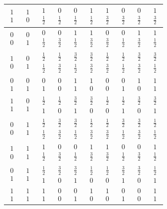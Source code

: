 \documentclass[11pt]{article}
\providecommand{\chpair}[2]{\begin{smallmatrix}#1\\#2\end{smallmatrix}}
\begin{document}
{\begin{tabular}{|cc||cc|cc|cc|cc|}
$\chpair{1}{1}$ & $\chpair{1}{0}$ & $\chpair{1}{\tfrac{1}{2}}$ & $\chpair{0}{\tfrac{1}{2}}$ & $\chpair{0}{\tfrac{1}{2}}$ & $\chpair{1}{\tfrac{1}{2}}$ & $\chpair{1}{\tfrac{3}{2}}$ & $\chpair{0}{\tfrac{3}{2}}$ & $\chpair{0}{\tfrac{3}{2}}$ & $\chpair{1}{\tfrac{3}{2}}$\\
\hline
$\chpair{0}{0}$ & $\chpair{0}{1}$ & $\chpair{0}{\tfrac{1}{2}}$ & $\chpair{0}{\tfrac{3}{2}}$ & $\chpair{1}{\tfrac{1}{2}}$ & $\chpair{1}{\tfrac{3}{2}}$ & $\chpair{0}{\tfrac{3}{2}}$ & $\chpair{0}{\tfrac{1}{2}}$ & $\chpair{1}{\tfrac{3}{2}}$ & $\chpair{1}{\tfrac{1}{2}}$\\
$\chpair{1}{0}$ & $\chpair{0}{1}$ & $\chpair{\tfrac{1}{2}}{\tfrac{1}{2}}$ & $\chpair{\tfrac{1}{2}}{\tfrac{3}{2}}$ & $\chpair{\tfrac{3}{2}}{\tfrac{1}{2}}$ & $\chpair{\tfrac{3}{2}}{\tfrac{3}{2}}$ & $\chpair{\tfrac{1}{2}}{\tfrac{3}{2}}$ & $\chpair{\tfrac{1}{2}}{\tfrac{1}{2}}$ & $\chpair{\tfrac{3}{2}}{\tfrac{3}{2}}$ & $\chpair{\tfrac{3}{2}}{\tfrac{1}{2}}$\\
$\chpair{0}{1}$ & $\chpair{0}{1}$ & $\chpair{0}{1}$ & $\chpair{0}{0}$ & $\chpair{1}{1}$ & $\chpair{1}{0}$ & $\chpair{0}{0}$ & $\chpair{0}{1}$ & $\chpair{1}{0}$ & $\chpair{1}{1}$\\
$\chpair{1}{1}$ & $\chpair{0}{1}$ & $\chpair{\tfrac{1}{2}}{1}$ & $\chpair{\tfrac{1}{2}}{0}$ & $\chpair{\tfrac{3}{2}}{1}$ & $\chpair{\tfrac{3}{2}}{0}$ & $\chpair{\tfrac{1}{2}}{0}$ & $\chpair{\tfrac{1}{2}}{1}$ & $\chpair{\tfrac{3}{2}}{0}$ & $\chpair{\tfrac{3}{2}}{1}$\\
\hline
$\chpair{0}{0}$ & $\chpair{1}{1}$ & $\chpair{\tfrac{1}{2}}{\tfrac{1}{2}}$ & $\chpair{\tfrac{3}{2}}{\tfrac{3}{2}}$ & $\chpair{\tfrac{3}{2}}{\tfrac{1}{2}}$ & $\chpair{\tfrac{1}{2}}{\tfrac{3}{2}}$ & $\chpair{\tfrac{1}{2}}{\tfrac{3}{2}}$ & $\chpair{\tfrac{3}{2}}{\tfrac{1}{2}}$ & $\chpair{\tfrac{3}{2}}{\tfrac{3}{2}}$ & $\chpair{\tfrac{1}{2}}{\tfrac{1}{2}}$\\
$\chpair{1}{0}$ & $\chpair{1}{1}$ & $\chpair{1}{\tfrac{1}{2}}$ & $\chpair{0}{\tfrac{3}{2}}$ & $\chpair{0}{\tfrac{1}{2}}$ & $\chpair{1}{\tfrac{3}{2}}$ & $\chpair{1}{\tfrac{3}{2}}$ & $\chpair{0}{\tfrac{1}{2}}$ & $\chpair{0}{\tfrac{3}{2}}$ & $\chpair{1}{\tfrac{1}{2}}$\\
$\chpair{0}{1}$ & $\chpair{1}{1}$ & $\chpair{\tfrac{1}{2}}{1}$ & $\chpair{\tfrac{3}{2}}{0}$ & $\chpair{\tfrac{3}{2}}{1}$ & $\chpair{\tfrac{1}{2}}{0}$ & $\chpair{\tfrac{1}{2}}{0}$ & $\chpair{\tfrac{3}{2}}{1}$ & $\chpair{\tfrac{3}{2}}{0}$ & $\chpair{\tfrac{1}{2}}{1}$\\
$\chpair{1}{1}$ & $\chpair{1}{1}$ & $\chpair{1}{1}$ & $\chpair{0}{0}$ & $\chpair{0}{1}$ & $\chpair{1}{0}$ & $\chpair{1}{0}$ & $\chpair{0}{1}$ & $\chpair{0}{0}$ & $\chpair{1}{1}$\\
\hline
\end{tabular}}
\endgroup
\end{document}
